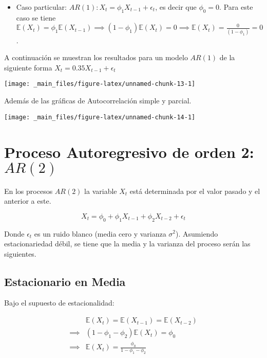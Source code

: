 \documentclass[
  a4paper,
  oneside,
  openany]{book}
\providecommand{\tightlist}{%
  \setlength{\itemsep}{0pt}\setlength{\parskip}{0pt}}
\begin{document}
\begin{itemize}
\tightlist
\item
  Caso particular: \(AR(1): X_t = \phi_1X_{t-1}+\epsilon_t\), es decir que \(\phi_0 = 0\). Para este caso se tiene \(\mathbb{E}(X_t) = \phi_1\mathbb{E}(X_{t-1})\implies(1-\phi_1)\mathbb{E}(X_t) = 0\implies\mathbb{E}(X_t) = \frac{0}{(1-\phi_1)} = 0\).
\end{itemize}

A continuación se muestran los resultados para un modelo \(AR(1)\) de la siguiente forma \(X_t=0.35X_{t-1}+\epsilon_t\)

\begin{center}\texttt{[image: \_main\_files/figure-latex/unnamed-chunk-13-1]} \end{center}

Además de las gráficas de Autocorrelación simple y parcial.

\begin{center}\texttt{[image: \_main\_files/figure-latex/unnamed-chunk-14-1]} \end{center}

\hypertarget{proceso-autoregresivo-de-orden-2-ar2}{%
\section{\texorpdfstring{Proceso Autoregresivo de orden 2: \(AR(2)\)}{Proceso Autoregresivo de orden 2: AR(2)}}\label{proceso-autoregresivo-de-orden-2-ar2}}

En los procesos \(AR(2)\) la variable \(X_t\) está determinada por el valor pasado y el anterior a este.

\[
X_t=\phi_0 + \phi_1 X_{t-1}+\phi_2 X_{t-2}+\epsilon_t
\]

Donde \(\epsilon_t\) es un ruido blanco (media cero y varianza \(\sigma^2\)). Asumiendo estacionariedad débil, se tiene que la media y la varianza del proceso serán las siguientes.

\hypertarget{estacionario-en-media-1}{%
\subsection{Estacionario en Media}\label{estacionario-en-media-1}}

Bajo el supuesto de estacionalidad:

\[
\begin{split}
& \mathbb{E}(X_t) = \mathbb{E}(X_{t-1}) = \mathbb{E}(X_{t-2})\\
\implies &(1-\phi_1-\phi_2)\mathbb{E}(X_t) = \phi_0\\
\implies &\mathbb{E}(X_t) = \frac{\phi_0}{1-\phi_1-\phi_2}
\end{split}
\]
\end{document}
